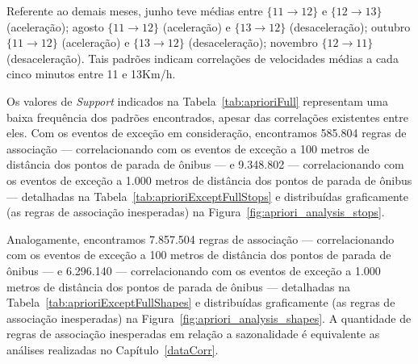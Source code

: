 \documentclass[
	12pt,				%
	oneside,			%
	a4paper,			%
	english,			%
	brazil				%
	]{abntex2ppgsi}
\begin{document}
{{{Referente ao demais meses, junho teve médias entre $\lbrace11 \rightarrow 12\rbrace$ e $\lbrace12 \rightarrow 13\rbrace$ (aceleração); agosto $\lbrace11 \rightarrow 12\rbrace$ (aceleração) e $\lbrace13 \rightarrow 12\rbrace$  (desaceleração); outubro $\lbrace11 \rightarrow 12\rbrace$ (aceleração) e $\lbrace13 \rightarrow 12\rbrace$ (desaceleração); novembro $\lbrace12 \rightarrow 11\rbrace$ (desaceleração). Tais padrões indicam correlações de velocidades médias a cada cinco minutos entre 11 e 13Km/h.

Os valores de \textit{Support} indicados na Tabela~\ref{tab:aprioriFull} representam uma baixa frequência dos padrões encontrados, apesar das correlações existentes entre eles. Com os eventos de exceção em consideração, encontramos 585.804 regras de associação --- correlacionando com os eventos de exceção a 100 metros de distância dos pontos de parada de ônibus --- e 9.348.802 --- correlacionando com os eventos de exceção a 1.000 metros de distância dos pontos de parada de ônibus --- detalhadas na Tabela~\ref{tab:aprioriExceptFullStops} e distribuídas graficamente (as regras de associação inesperadas) na Figura~\ref{fig:apriori_analysis_stops}. 

Analogamente, encontramos 7.857.504 regras de associação --- correlacionando com os eventos de exceção a 100 metros de distância dos pontos de parada de ônibus --- e 6.296.140 --- correlacionando com os eventos de exceção a 1.000 metros de distância dos pontos de parada de ônibus --- detalhadas na Tabela~\ref{tab:aprioriExceptFullShapes} e distribuídas graficamente (as regras de associação inesperadas)  na Figura~\ref{fig:apriori_analysis_shapes}. A quantidade de regras de associação inesperadas em relação a sazonalidade é equivalente as análises realizadas no Capítulo~\ref{dataCorr}.

}}}
\end{document}
